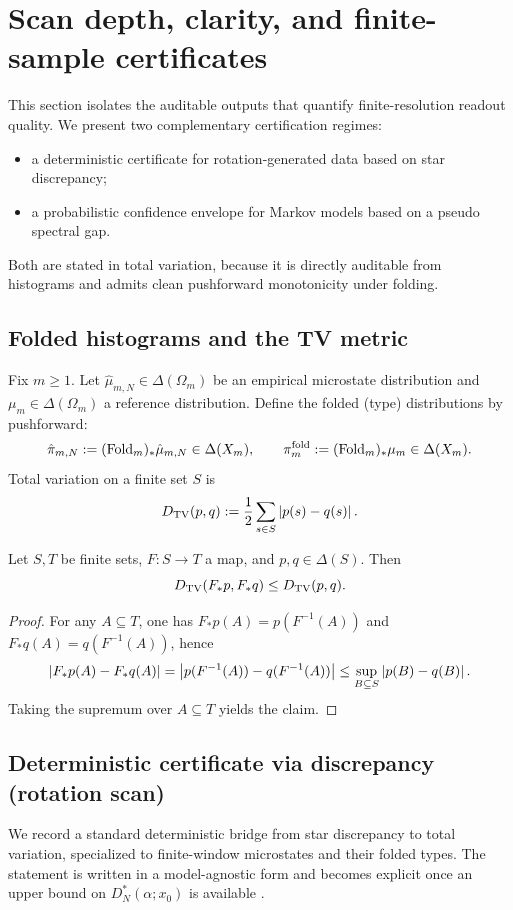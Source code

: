 \section{Scan depth, clarity, and finite-sample certificates}\label{sec:certificates}

This section isolates the auditable outputs that quantify finite-resolution readout quality.
We present two complementary certification regimes:
\begin{itemize}
  \item a deterministic certificate for rotation-generated data based on star discrepancy;
  \item a probabilistic confidence envelope for Markov models based on a pseudo spectral gap.
\end{itemize}
Both are stated in total variation, because it is directly auditable from histograms and admits clean pushforward monotonicity under folding.

\subsection{Folded histograms and the TV metric}\label{subsec:cert-tv-setup}
Fix $m\ge 1$.
Let $\hat{\mu}_{m,N}\in\Delta(\Omega_m)$ be an empirical microstate distribution and $\mu_m\in\Delta(\Omega_m)$ a reference distribution.
Define the folded (type) distributions by pushforward:
\[
\hat{\pi}_{m,N}:=(\mathrm{Fold}_m)_*\hat{\mu}_{m,N}\in\Delta(X_m),
\qquad
\pi_m^{\mathrm{fold}}:=(\mathrm{Fold}_m)_*\mu_m\in\Delta(X_m).
\]
Total variation on a finite set $S$ is
\[
D_{\mathrm{TV}}(p,q):=\frac12\sum_{s\in S}\left\lvert p(s)-q(s)\right\rvert.
\]

\begin{lemma}\label{lem:tv-pushforward}
Let $S,T$ be finite sets, $F:S\to T$ a map, and $p,q\in\Delta(S)$.
Then
\[
D_{\mathrm{TV}}(F_*p,F_*q)\le D_{\mathrm{TV}}(p,q).
\]
\end{lemma}

\begin{proof}
For any $A\subseteq T$, one has $F_*p(A)=p(F^{-1}(A))$ and $F_*q(A)=q(F^{-1}(A))$, hence
\[
\left\lvert F_*p(A)-F_*q(A)\right\rvert=\left\lvert p(F^{-1}(A))-q(F^{-1}(A))\right\rvert\le \sup_{B\subseteq S}\left\lvert p(B)-q(B)\right\rvert.
\]
Taking the supremum over $A\subseteq T$ yields the claim.
\end{proof}

\subsection{Deterministic certificate via discrepancy (rotation scan)}\label{subsec:cert-discrepancy}
We record a standard deterministic bridge from star discrepancy to total variation, specialized to finite-window microstates and their folded types.
The statement is written in a model-agnostic form and becomes explicit once an upper bound on $D_N^*(\alpha;x_0)$ is available \cite{KuipersNiederreiter1974}.

